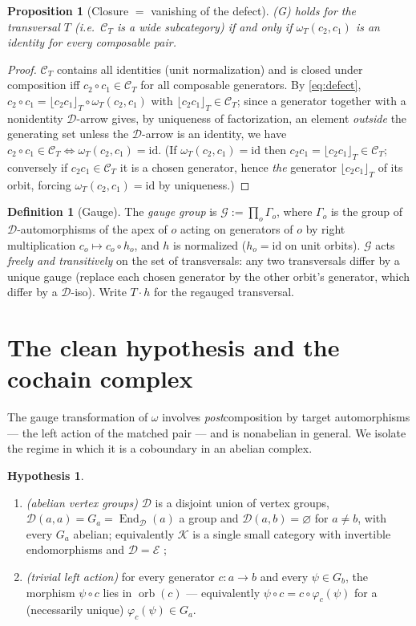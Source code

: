 \documentclass[11pt]{article}
\newtheorem{proposition}[theorem]{Proposition}
\theoremstyle{definition}
\newtheorem{definition}[theorem]{Definition}
\newtheorem{hypo}{Hypothesis}
\newcommand{\End}{\operatorname{End}}
\newcommand{\id}{\mathrm{id}}
\newcommand{\C}{\mathcal{C}}
\newcommand{\D}{\mathcal{D}}
\newcommand{\K}{\mathcal{K}}
\newcommand{\E}{\mathcal{E}}
\newcommand{\orb}{\operatorname{orb}}
\newcommand{\flr}[1]{\lfloor #1 \rfloor}
\newcommand{\1}{\mathbf{1}}
\begin{document}
\begin{proposition}[Closure $=$ vanishing of the defect]\label{prop:closure}
\textnormal{(G)} holds for the transversal $T$ (i.e.\ $\C_T$ is a wide subcategory)
if and only if $\omega_T(c_2,c_1)$ is an identity for every composable pair.
\end{proposition}

\begin{proof}
$\C_T$ contains all identities (unit normalization) and is closed under composition
iff $c_2\circ c_1\in\C_T$ for all composable generators. By \eqref{eq:defect},
$c_2\circ c_1=\flr{c_2c_1}_T\circ\omega_T(c_2,c_1)$ with $\flr{c_2c_1}_T\in\C_T$;
since a generator together with a nonidentity $\D$-arrow gives, by uniqueness of
factorization, an element \emph{outside} the generating set unless the $\D$-arrow
is an identity, we have $c_2\circ c_1\in\C_T\iff\omega_T(c_2,c_1)=\id$. (If
$\omega_T(c_2,c_1)=\id$ then $c_2c_1=\flr{c_2c_1}_T\in\C_T$; conversely if
$c_2c_1\in\C_T$ it is a chosen generator, hence \emph{the} generator
$\flr{c_2c_1}_T$ of its orbit, forcing $\omega_T(c_2,c_1)=\id$ by uniqueness.)
\end{proof}

\begin{definition}[Gauge]\label{def:gauge}
The \emph{gauge group} is $\mathcal G:=\prod_{o}\Gamma_o$, where $\Gamma_o$ is the
group of $\D$-automorphisms of the apex of $o$ acting on generators of $o$ by right
multiplication $c_o\mapsto c_o\circ h_o$, and $h$ is normalized ($h_o=\id$ on unit
orbits). $\mathcal G$ acts \emph{freely and transitively} on the set of
transversals: any two transversals differ by a unique gauge (replace each chosen
generator by the other orbit's generator, which differ by a $\D$-iso). Write
$T\cdot h$ for the regauged transversal.
\end{definition}

\section{The clean hypothesis and the cochain complex}

The gauge transformation of $\omega$ involves \emph{post}composition by target
automorphisms --- the left action of the matched pair --- and is nonabelian in
general. We isolate the regime in which it is a coboundary in an abelian complex.

\begin{hypo}\label{hyp}\leavevmode
\begin{enumerate}
\item[(i)] \emph{(abelian vertex groups)} $\D$ is a disjoint union of vertex groups,
$\D(a,a)=G_a=\End_\D(a)$ a group and $\D(a,b)=\varnothing$ for $a\neq b$, with every
$G_a$ abelian; equivalently $\K$ is a single small category with invertible
endomorphisms and $\D=\E$ \cite{cocycle};
\item[(ii)] \emph{(trivial left action)} for every generator $c\colon a\to b$ and
every $\psi\in G_b$, the morphism $\psi\circ c$ lies in $\orb(c)$ --- equivalently
$\psi\circ c=c\circ\varphi_c(\psi)$ for a (necessarily unique) $\varphi_c(\psi)\in
G_a$.
\end{enumerate}
\end{hypo}
\end{document}
